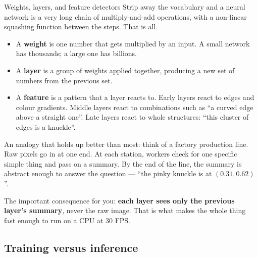 \begin{mlconcept}{Weights, layers, and feature detectors}
Strip away the vocabulary and a neural network is a very long chain of multiply-and-add operations,
with a non-linear squashing function between the steps. That is all.

\begin{itemize}
  \item A \textbf{weight} is one number that gets multiplied by an input. A small network has
        thousands; a large one has billions.
  \item A \textbf{layer} is a group of weights applied together, producing a new set of numbers from
        the previous set.
  \item A \textbf{feature} is a pattern that a layer reacts to. Early layers react to edges and
        colour gradients. Middle layers react to combinations such as ``a curved edge above a
        straight one''. Late layers react to whole structures: ``this cluster of edges is a
        knuckle''.
\end{itemize}

An analogy that holds up better than most: think of a factory production line. Raw pixels go in at
one end. At each station, workers check for one specific simple thing and pass on a summary. By the
end of the line, the summary is abstract enough to answer the question --- ``the pinky knuckle is at
$(0.31, 0.62)$''.

The important consequence for you: \textbf{each layer sees only the previous layer's summary}, never
the raw image. That is what makes the whole thing fast enough to run on a CPU at 30 FPS.
\end{mlconcept}

\subsection{Training versus inference}

